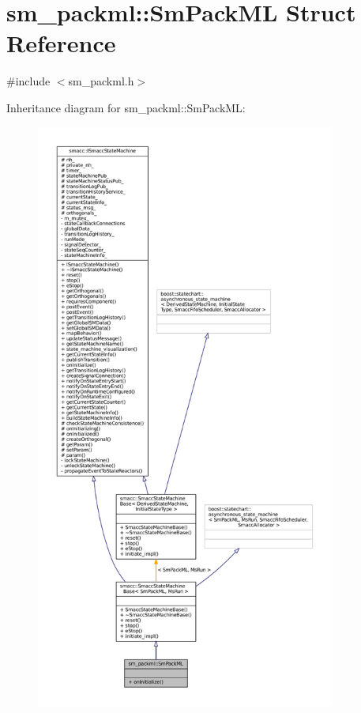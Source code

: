 \hypertarget{structsm__packml_1_1SmPackML}{}\section{sm\+\_\+packml\+:\+:Sm\+Pack\+ML Struct Reference}
\label{structsm__packml_1_1SmPackML}


{\ttfamily \#include $<$sm\+\_\+packml.\+h$>$}



Inheritance diagram for sm\+\_\+packml\+:\+:Sm\+Pack\+ML\+:
\nopagebreak
\begin{figure}[H]
\begin{center}
\leavevmode
\includegraphics[height=550pt]{structsm__packml_1_1SmPackML__inherit__graph}
\end{center}
\end{figure}


